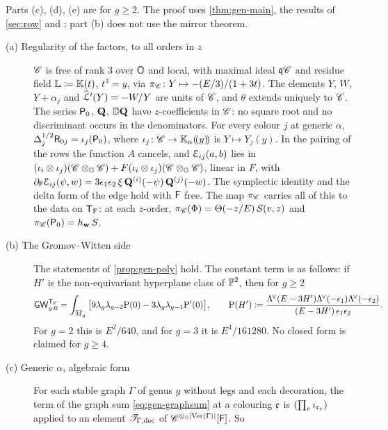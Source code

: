 \begin{thm}
\label{thm:spe-main}
Parts \textup{(c)}, \textup{(d)}, \textup{(e)} are for $g\geq 2$. The proof uses \cref{thm:gen-main}, the results of \cref{sec:row} and \cite{GP99}; part \textup{(b)} does not use the mirror theorem.
\begin{description}
\item[(a) Regularity of the factors, to all orders in $z$] $\mathscr{C}$ is free of rank $3$ over $\mathbb{O}$ and local, with maximal ideal $\mathfrak{q}\mathscr{C}$ and residue field $\mathbb{L}\coloneqq\mathbb{K}(t)$, $t^3=y$, via $\pi_{\mathscr{C}}\colon Y\mapsto-(E/3)/(1+3t)$. The elements $Y$, $W$, $Y+\alpha_j$ and $\widehat{\mathcal{L}}'(Y)=-W/Y$ are units of $\mathscr{C}$, and $\theta$ extends uniquely to $\mathscr{C}$. The series $\mathsf{P}_0$, $\mathbf{Q}$, $\mathbb{D}\mathbf{Q}$ have $z$-coefficients in $\mathscr{C}$: no square root and no discriminant occurs in the denominators. For every colour $j$ at generic $\alpha$, $\Delta_j^{1/2}\mathsf{R}_{0j}=\iota_j(\mathsf{P}_0)$, where $\iota_j\colon\mathscr{C}\to\mathbb{K}_{\alpha}(\!(y)\!)$ is $Y\mapsto Y_j(y)$. In the pairing of the rows the function $A$ cancels, and $\mathcal{E}_{ij}(a,b)$ lies in $(\iota_i\otimes\iota_j)(\mathscr{C}\otimes_{\mathbb{O}}\mathscr{C})+F(\iota_i\otimes\iota_j)(\mathscr{C}\otimes_{\mathbb{O}}\mathscr{C})$, linear in $F$, with $\partial_{\mathsf{F}}\mathcal{E}_{ij}(\psi,w)=3\epsilon_1\epsilon_2\,\xi\,\mathbf{Q}^{(i)}(-\psi)\,\mathbf{Q}^{(j)}(-w)$. The symplectic identity and the delta form of the edge hold with $\mathsf{F}$ free. The map $\pi_{\mathscr{C}}$ carries all of this to the data on $\mathsf{T}_{\mathrm{F}}$: at each $z$-order, $\pi_{\mathscr{C}}(\Phi)=\Theta(-z/E)\,S(v,z)$ and $\pi_{\mathscr{C}}(\mathsf{P}_0)=h_{\mathbf{w}}\,S$.
\item[(b) The Gromov--Witten side] The statements of \cref{prop:gen-poly} hold. The constant term is as follows: if $H'$ is the non-equivariant hyperplane class of $\mathbb{P}^2$, then for $g\geq2$
\[
\mathsf{GW}_{g,0}^{\mathsf{T}_{\mathrm{F}}}=\int_{\overline{M}_g}\big[9\lambda_g\lambda_{g-2}\mathrm{P}(0)-3\lambda_g\lambda_{g-1}\mathrm{P}'(0)\big],\qquad
\mathrm{P}(H')\coloneqq\frac{\Lambda^{\!\vee}(E-3H')\Lambda^{\!\vee}(-\epsilon_1)\Lambda^{\!\vee}(-\epsilon_2)}{(E-3H')\,\epsilon_1\epsilon_2}.
\]
For $g=2$ this is $E^2/640$, and for $g=3$ it is $E^4/161280$. No closed form is claimed for $g\geq 4$.
\item[(c) Generic $\alpha$, algebraic form] For each stable graph $\Gamma$ of genus $g$ without legs and each decoration, the term of the graph sum \eqref{eq:gen-graphsum} at a colouring $\mathfrak{c}$ is $(\prod_v\iota_{\mathfrak{c}_v})$ applied to an element $\mathscr{T}_{\Gamma,\mathrm{dec}}$ of $\mathscr{C}^{\otimes_{\mathbb{O}}|\mathrm{Ver}(\Gamma)|}[\mathsf{F}]$. So

\end{description}
\end{thm}
